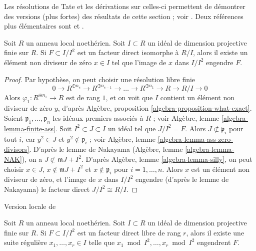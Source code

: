 \noindent
Les résolutions de Tate et les dérivations sur celles-ci permettent de démontrer
des versions (plus fortes) des résultats de cette section ; voir \cite{Iyengar}.
Deux références plus élémentaires sont
\cite{Vasconcelos} et \cite{Ferrand-lci}.

\begin{lemma}
\label{lemma-free-summand-in-ideal-finite-proj-dim}
\begin{reference}
\cite{Vasconcelos}
\end{reference}
Soit $R$ un anneau local noethérien. Soit $I \subset R$ un idéal
de dimension projective finie sur $R$. Si $F \subset I/I^2$ est un
facteur direct isomorphe à $R/I$, alors il existe un élément non diviseur de zéro
$x \in I$ tel que l'image de $x$ dans $I/I^2$ engendre $F$.
\end{lemma}

\begin{proof}
Par hypothèse, on peut choisir une résolution libre finie
$$
0 \to R^{\oplus n_e} \to R^{\oplus n_{e-1}} \to \ldots \to
R^{\oplus n_1} \to R \to R/I \to 0
$$
Alors $\varphi_1 : R^{\oplus n_1} \to R$ est de rang $1$, et
on voit que $I$ contient un élément non diviseur de zéro $y$, d'après
Algèbre, proposition \ref{algebra-proposition-what-exact}.
Soient $\mathfrak p_1, \ldots, \mathfrak p_n$ les idéaux premiers associés
à $R$ ; voir Algèbre, lemme \ref{algebra-lemma-finite-ass}.
Soit $I^2 \subset J \subset I$ un idéal tel que $J/I^2 = F$.
Alors $J \not \subset \mathfrak p_i$ pour tout $i$,
car $y^2 \in J$ et $y^2 \not \in \mathfrak p_i$ ; voir
Algèbre, lemme \ref{algebra-lemma-ass-zero-divisors}.
D'après le lemme de Nakayama (Algèbre, lemme \ref{algebra-lemma-NAK}),
on a $J \not \subset \mathfrak m J + I^2$.
D'après Algèbre, lemme \ref{algebra-lemma-silly},
on peut choisir $x \in J$, $x \not \in \mathfrak m J + I^2$ et
$x \not \in \mathfrak p_i$ pour $i = 1, \ldots, n$.
Alors $x$ est un élément non diviseur de zéro, et l'image
de $x$ dans $I/I^2$ engendre (d'après le lemme de Nakayama)
le facteur direct $J/I^2 \cong R/I$.
\end{proof}

\begin{lemma}
\label{lemma-vasconcelos}
\begin{reference}
Version locale de \cite[Theorem 1.1]{Vasconcelos}
\end{reference}
Soit $R$ un anneau local noethérien. Soit $I \subset R$ un idéal
de dimension projective finie sur $R$. Si $F \subset I/I^2$
est un facteur direct libre de rang $r$, alors il existe une suite régulière
$x_1, \ldots, x_r \in I$ telle que $x_1 \bmod I^2, \ldots, x_r \bmod I^2$
engendrent $F$.
\end{lemma}

